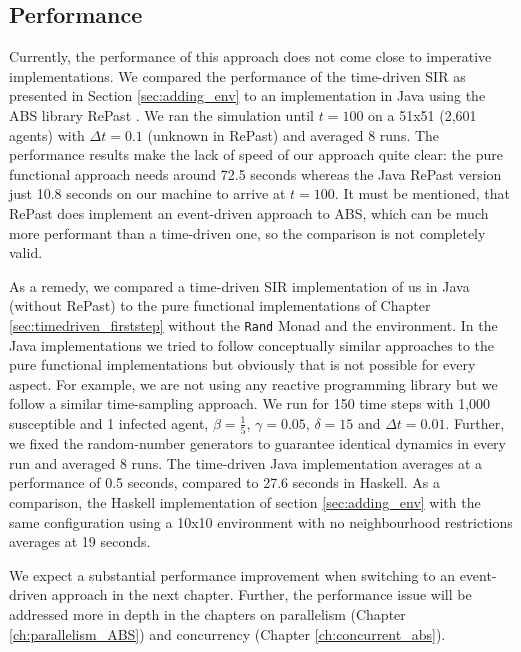 \subsection{Performance}
Currently, the performance of this approach does not come close to imperative implementations. We compared the performance of the time-driven SIR as presented in Section \ref{sec:adding_env} to an implementation in Java using the ABS library RePast \cite{north_complex_2013}. We ran the simulation until $t = 100$ on a 51x51 (2,601 agents) with $\Delta t = 0.1$ (unknown in RePast) and averaged 8 runs. The performance results make the lack of speed of our approach quite clear: the pure functional approach needs around 72.5 seconds whereas the Java RePast version just 10.8 seconds on our machine to arrive at $t = 100$. It must be mentioned, that RePast does implement an event-driven approach to ABS, which can be much more performant \cite{meyer_event-driven_2014} than a time-driven one, so the comparison is not completely valid.

As a remedy, we compared a time-driven SIR implementation of us in Java (without RePast) to the pure functional implementations of Chapter \ref{sec:timedriven_firststep} without the \texttt{Rand} Monad and the environment. In the Java implementations we tried to follow conceptually similar approaches to the pure functional implementations but obviously that is not possible for every aspect. For example, we are not using any reactive programming library but we follow a similar time-sampling approach. We run for 150 time steps with 1,000 susceptible and 1 infected agent, $\beta = \frac{1}{5}$, $\gamma = 0.05$, $\delta = 15$ and $\Delta t = 0.01$. Further, we fixed the random-number generators to guarantee identical dynamics in every run and averaged 8 runs. The time-driven Java implementation averages at a performance of 0.5 seconds, compared to 27.6 seconds in Haskell. As a comparison, the Haskell implementation of section \ref{sec:adding_env} with the same configuration using a 10x10 environment with no neighbourhood restrictions averages at 19 seconds.

We expect a substantial performance improvement when switching to an event-driven approach \cite{meyer_event-driven_2014} in the next chapter. Further, the performance issue will be addressed more in depth in the chapters on parallelism (Chapter \ref{ch:parallelism_ABS}) and concurrency (Chapter \ref{ch:concurrent_abs}).